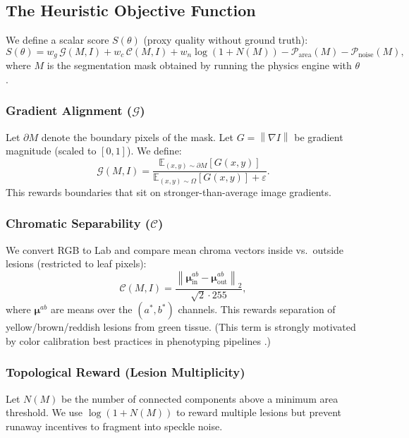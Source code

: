 \documentclass[11pt,a4paper]{article}
\newcommand{\E}{\mathbb{E}}
\newcommand{\grad}{\nabla}
\newcommand{\norm}[1]{\left\lVert #1 \right\rVert}
\begin{document}
\subsection{The Heuristic Objective Function}
\label{sec:objective}
We define a scalar score $S(\theta)$ (proxy quality without ground truth):
\begin{equation}
S(\theta) = w_g \,\mathcal{G}(M,I) + w_c \,\mathcal{C}(M,I) + w_n \log(1+N(M))
            - \mathcal{P}_{\mathrm{area}}(M) - \mathcal{P}_{\mathrm{noise}}(M),
\label{eq:objective}
\end{equation}
where $M$ is the segmentation mask obtained by running the physics engine with $\theta$.

\subsubsection{Gradient Alignment ($\mathcal{G}$)}
Let $\partial M$ denote the boundary pixels of the mask. Let $G=\norm{\grad I}$ be gradient magnitude (scaled to $[0,1]$). We define:
\begin{equation}
\mathcal{G}(M,I) = \frac{\E_{(x,y)\sim \partial M}[G(x,y)]}{\E_{(x,y)\sim \Omega}[G(x,y)] + \varepsilon}.
\end{equation}
This rewards boundaries that sit on stronger-than-average image gradients.

\subsubsection{Chromatic Separability ($\mathcal{C}$)}
We convert RGB to Lab and compare mean chroma vectors inside vs.\ outside lesions (restricted to leaf pixels):
\begin{equation}
\mathcal{C}(M,I) = \frac{\norm{\bm{\mu}_{\mathrm{in}}^{ab}-\bm{\mu}_{\mathrm{out}}^{ab}}_2}{\sqrt{2}\cdot 255},
\end{equation}
where $\bm{\mu}^{ab}$ are means over the $(a^\ast,b^\ast)$ channels. This rewards separation of yellow/brown/reddish lesions from green tissue. (This term is strongly motivated by color calibration best practices in phenotyping pipelines \citep{berry2018color,plantcv2025}.)

\subsubsection{Topological Reward (Lesion Multiplicity)}
Let $N(M)$ be the number of connected components above a minimum area threshold. We use $\log(1+N(M))$ to reward multiple lesions but prevent runaway incentives to fragment into speckle noise.
\end{document}
